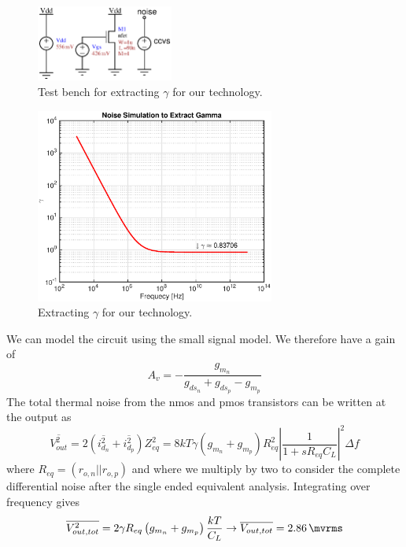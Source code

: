 \documentclass[letterpaper, notitlepage]{revtex4-1}
\begin{document}
\begin{figure}[h]
\begin{center}
\includegraphics[width=0.4\textwidth]{GammaTest.eps}
\caption{Test bench for extracting $\gamma$ for our technology.}
\label{fig:GammaTest}
\end{center}
\end{figure}
\begin{figure}[h]
\begin{center}
\includegraphics[width=0.7\textwidth]{Gamma.eps}
\caption{Extracting $\gamma$ for our technology.}
\label{fig:Gamma}
\end{center}
\end{figure}
We can model the circuit using the small signal model. We therefore have a gain of
\begin{equation}
A_v=-\frac{g_{m_n}}{g_{ds_{n}}+g_{ds_{p}}-g_{m_p}}
\end{equation}
The total thermal noise from the nmos and pmos transistors can be written at the output as
\begin{equation}
\overline{V_{out}^2}=2\left( \overline{i_{d_n}^2}  +\overline{i_{d_p}^2}  \right)Z_{eq}^2=8kT\gamma\left(g_{m_n}+g_{m_p}\right)R_{eq}^2\left|\frac{1}{1+sR_{eq}C_L}\right|^2\Delta f
\end{equation}
where $R_{eq}=\left(r_{o,n}||r_{o,p}\right)$ and where we multiply by two to consider the complete differential noise after the single ended equivalent analysis. Integrating over frequency gives
\begin{equation}
\overline{V_{out,tot}^2}=2\gamma R_{eq}\left(g_{m_n}+g_{m_p}\right)\frac{kT}{C_L}\rightarrow \overline{V_{out,tot}}=\SI{2.86}{\mvrms}
\end{equation}
\end{document}
